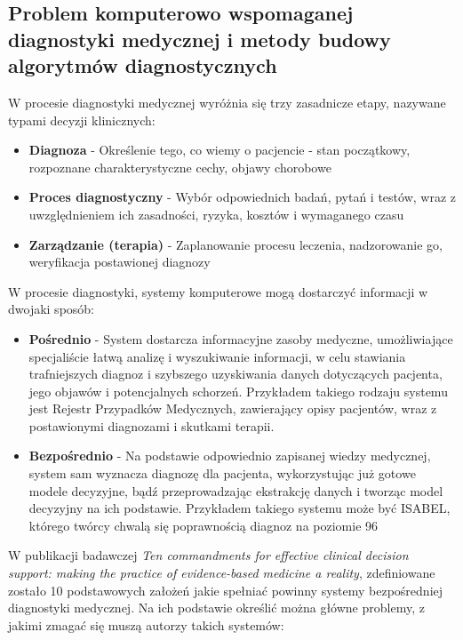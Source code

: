 \subsection{Problem komputerowo wspomaganej diagnostyki medycznej i metody budowy algorytmów diagnostycznych}

W procesie diagnostyki medycznej wyróżnia się trzy zasadnicze etapy, nazywane typami decyzji klinicznych:


\begin{itemize}
	\item \textbf{Diagnoza} - Określenie tego, co wiemy o pacjencie - stan początkowy, rozpoznane charakterystyczne cechy, objawy chorobowe
	\item \textbf{Proces diagnostyczny} - Wybór odpowiednich badań, pytań i testów, wraz z uwzględnieniem ich zasadności, ryzyka, kosztów i wymaganego czasu
	\item \textbf{Zarządzanie (terapia)} - Zaplanowanie procesu leczenia, nadzorowanie go, weryfikacja postawionej diagnozy
\end{itemize}

W procesie diagnostyki, systemy komputerowe mogą dostarczyć informacji w dwojaki sposób:

\begin{itemize}
	\item \textbf{Pośrednio} - System dostarcza informacyjne zasoby medyczne, umożliwiające specjaliście łatwą analizę i wyszukiwanie informacji, w celu stawiania trafniejszych diagnoz i szybszego uzyskiwania danych dotyczących pacjenta, jego objawów i potencjalnych schorzeń. Przykładem takiego rodzaju systemu jest Rejestr Przypadków Medycznych, zawierający opisy pacjentów, wraz z postawionymi diagnozami i skutkami terapii.
	\item \textbf{Bezpośrednio} - Na podstawie odpowiednio zapisanej wiedzy medycznej, system sam wyznacza diagnozę dla pacjenta, wykorzystując już gotowe modele decyzyjne, bądź przeprowadzając ekstrakcję danych i tworząc model decyzyjny na ich podstawie. Przykładem takiego systemu może być ISABEL, którego twórcy chwalą się poprawnością diagnoz na poziomie 96%
\end{itemize}

W publikacji badawczej \textit{Ten commandments for effective clinical decision support: making the practice of evidence-based medicine a reality}, zdefiniowane zostało 10 podstawowych założeń jakie spełniać powinny systemy bezpośredniej diagnostyki medycznej. Na ich podstawie określić można główne problemy, z jakimi zmagać się muszą autorzy takich systemów:

